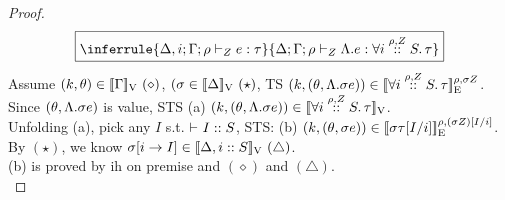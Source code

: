 \documentclass[a4paper,11pt]{article}
\theoremstyle{definition}
\begin{document}
\begin{proof}
\[
\boxed{
  \inferrule{
      \Delta, i; \Gamma ;\dmap \tvdash{\nnatA} \expr: \type
    }{
     \Delta;  \Gamma; \dmap \tvdash{\nnatA}    \eilam \expr    :  \tforall{\dmap}{\nnatA}{i} \type 
    }
    }
\]
Assume $(\stepiA, \env) \in \lrv{\Gamma } ~ (\diamond)$, $(\ienv \in \lrv{\Delta}~(\star)$, TS $(\stepiA, (\env, \eilam \ienv \expr)) \in \lre{\dmap}{\ienv \nnatA}{\tforall{\dmap}{\nnatA}{i} \type} $.\\
%
Since $(\env, \eilam \ienv \expr)$ is value, STS (a) $(\stepiA, (\env, \eilam \ienv \expr)) \in \lrv{\tforall{\dmap}{\nnatA}{i} \type}$.\\
%
Unfolding (a), pick any $I$ s.t. $\tvdash{} I :: S$, STS: (b) $(\stepiA, (\env, \ienv \expr)) \in \lre{\dmap}{(\ienv \nnatA)[I/i]}{\ienv \type [I/i]}$.\\
%
By $(\star)$, we know $\ienv[i \to I] \in \lrv{\Delta, i::S} ~ (\triangle)$.\\
%
(b) is proved by ih on premise and $(\diamond)$ and $(\triangle)$.\\



\end{proof}
\end{document}
